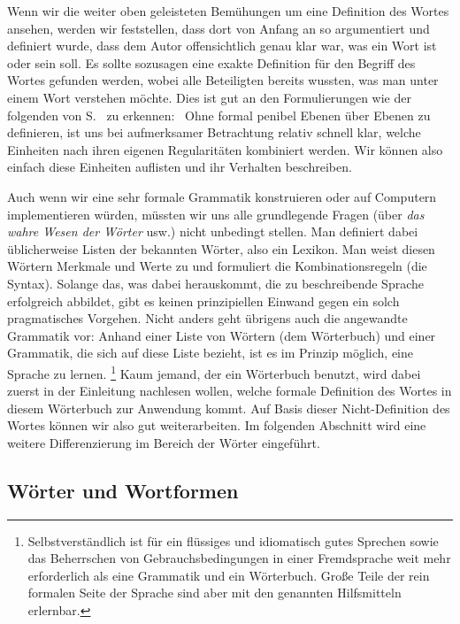 Wenn wir die weiter oben geleisteten Bemühungen um eine Definition des Wortes ansehen, werden wir feststellen, dass dort von Anfang an so argumentiert und definiert wurde, dass dem Autor offensichtlich genau klar war, was ein Wort ist oder sein soll.
Es sollte sozusagen eine exakte Definition für den Begriff des Wortes gefunden werden, wobei alle Beteiligten bereits wussten, was man unter einem Wort verstehen möchte.
Dies ist gut an den Formulierungen wie der folgenden von S.~\pageref{arbref:9234645} zu erkennen:
\textit{\Quotenonphonoleinheitwort}\ 
Ohne formal penibel Ebenen über Ebenen zu definieren, ist uns bei aufmerksamer Betrachtung relativ schnell klar, welche Einheiten nach ihren eigenen Regularitäten kombiniert werden.
Wir können also einfach diese Einheiten auflisten und ihr Verhalten beschreiben.

Auch wenn wir eine sehr formale Grammatik konstruieren oder auf Computern implementieren würden, müssten wir uns alle grundlegende Fragen (über \textit{das wahre Wesen der Wörter} usw.) nicht unbedingt stellen.
Man definiert dabei üblicherweise Listen der bekannten Wörter, also ein Lexikon.
Man weist diesen Wörtern Merkmale und Werte zu und formuliert die Kombinationsregeln (die Syntax).
Solange das, was dabei herauskommt, die zu beschreibende Sprache erfolgreich abbildet, gibt es keinen prinzipiellen Einwand gegen ein solch pragmatisches Vorgehen.
Nicht anders geht übrigens auch die angewandte Grammatik vor:
Anhand einer Liste von Wörtern (dem Wörterbuch) und einer Grammatik, die sich auf diese Liste bezieht, ist es im Prinzip möglich, eine Sprache zu lernen.%
\footnote{Selbstverständlich ist für ein flüssiges und idiomatisch gutes Sprechen sowie das Beherrschen von Gebrauchsbedingungen in einer Fremdsprache weit mehr erforderlich als eine Grammatik und ein Wörterbuch.
Große Teile der rein formalen Seite der Sprache sind aber mit den genannten Hilfsmitteln erlernbar.}
Kaum jemand, der ein Wörterbuch benutzt, wird dabei zuerst in der Einleitung nachlesen wollen, welche formale Definition des Wortes in diesem Wörterbuch zur Anwendung kommt.
Auf Basis dieser Nicht-Definition des Wortes können wir also gut weiterarbeiten.
Im folgenden Abschnitt wird eine weitere Differenzierung im Bereich der Wörter eingeführt.

\subsection{Wörter und Wortformen}

\label{sec:woerterwortformen}

